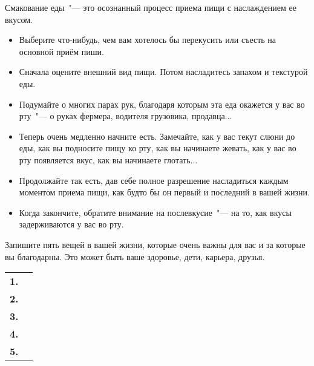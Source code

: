 \newpage
{} \label{IP:Savoring_Food}

Смакование еды~"--- это осознанный процесс приема пищи с наслаждением ее вкусом.

\begin{itemize}
	\item Выберите что-нибудь, чем вам хотелось бы перекусить или съесть на основной приём пиши.
	
	\item Сначала оцените внешний вид пищи. Потом насладитесь запахом и текстурой еды.
	
	\item Подумайте о многих парах рук, благодаря которым эта еда окажется у вас во рту~"--- о руках фермера, водителя грузовика, продавца...
	
	\item Теперь очень медленно начните есть.  Замечайте, как у вас текут слюни до еды, как вы подносите пищу ко рту, как вы начинаете жевать, как у вас во рту появляется вкус, как вы начинаете глотать...
	
	\item Продолжайте так есть, дав себе полное разрешение насладиться каждым моментом приема пищи, как будто бы он первый и последний в вашей жизни. 
	
	\item Когда закончите, обратите внимание на послевкусие~"--- на то, как вкусы задерживаются у вас во рту.
\end{itemize}


\newpage
{} \label{Ex:Gratitude_for_the_Big_and_Small_Things}


Запишите пять вещей в вашей жизни, которые очень важны для вас и за которые вы благодарны. Это может быть ваше здоровье, дети, карьера, друзья.

\vspace{1ex}

\noindent
\setlength{\extrarowheight}{2mm}
\begin{tabular*}{\textwidth}{rp{13.5cm}}
	\textbf{1.} & \\ \cline{2-2}
	\textbf{2.} & \\ \cline{2-2}
	\textbf{3.} & \\ \cline{2-2}
	\textbf{4.} & \\ \cline{2-2}
	\textbf{5.} & \\ \cline{2-2}
\end{tabular*}
\setlength{\extrarowheight}{0mm}

